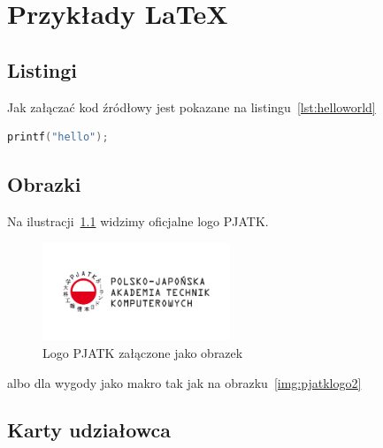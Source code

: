 
\chapter{Przykłady LaTeX}
\label{ch:przykady-latex}

\section{Listingi}
\label{sec:listingi}
Jak załączać kod źródłowy jest pokazane na listingu~\ref{lst:helloworld}

\begin{lstlisting}[language=c,caption={Przykładowy witaj w świecie}, label={lst:helloworld}]
printf("hello");
\end{lstlisting}

\section{Obrazki}
\label{sec:obrazki}

Na ilustracji~\ref{fig:pjatklogo} widzimy oficjalne logo PJATK\@.

\begin{figure}[h]
    \centering
    \includegraphics[width=0.5\textwidth]{attachments/pjatk}
    \caption{Logo PJATK załączone jako obrazek}
    \label{fig:pjatklogo}
\end{figure}

albo dla wygody jako makro tak jak na obrazku~\ref{img:pjatklogo2}


\section{Karty udziałowca}
\label{sec:karty-udziaowca}

\begin{stakeholder}[label={tab:stakeholder:someholder},caption={Przykładowy opis udzialowca}]
\end{stakeholder}

